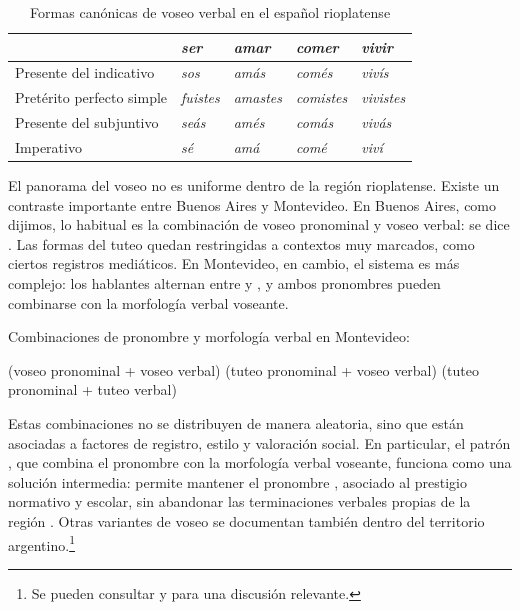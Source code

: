\begin{table}[htbp]
  \centering\small
  \caption{Formas canónicas de voseo verbal en el español
    rioplatense}\label{tab:15-voseo}
  \begin{tabular}{@{}lllll@{}}
    \toprule
    & \textit{ser} & \textit{amar} & \textit{comer} & \textit{vivir} \\
    \midrule
    Presente del indicativo & \textit{sos} & \textit{amás} & \textit{comés} &
      \textit{vivís} \\
    Pretérito perfecto simple & \textit{fuistes} & \textit{amastes} &
      \textit{comistes} & \textit{vivistes} \\
    Presente del subjuntivo & \textit{seás} & \textit{amés} & \textit{comás} &
      \textit{vivás} \\
    Imperativo & \textit{sé} & \textit{amá} & \textit{comé} & \textit{viví} \\
    \bottomrule
  \end{tabular}
\end{table}


El panorama del voseo no es uniforme dentro de la región rioplatense. Existe un
contraste importante entre Buenos Aires y Montevideo. En Buenos Aires, como
dijimos, lo habitual es la combinación de voseo pronominal y voseo verbal: se
dice . Las formas del tuteo quedan restringidas a
contextos muy marcados, como ciertos registros mediáticos. En Montevideo, en
cambio, el sistema es más complejo: los hablantes alternan entre  y
, y ambos pronombres pueden combinarse con la morfología verbal
voseante.

\begin{exe}
  \ex\label{ex:15-montevideo} Combinaciones de pronombre y morfología verbal en
      Montevideo:
    \begin{xlist}
      \ex {} (voseo pronominal + voseo verbal)
      \ex\label{ex:15-montevideo-b}  (tuteo pronominal + voseo
          verbal)
      \ex {} (tuteo pronominal + tuteo verbal)
    \end{xlist}
\end{exe}

Estas combinaciones no se distribuyen de manera aleatoria, sino que están
asociadas a factores de registro, estilo y valoración social. En particular, el
patrón , que combina el pronombre  con la
morfología verbal voseante, funciona como una solución intermedia: permite
mantener el pronombre , asociado al prestigio normativo y escolar, sin
abandonar las terminaciones verbales propias de la región
\parencite{bertolotti2011}. Otras variantes de voseo se documentan también dentro
del territorio argentino.\footnote{Se pueden consultar \textcite{ditullio2010b} y
\textcite{estomba2012} para una discusión relevante.}

